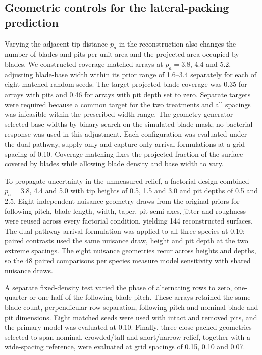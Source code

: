 \documentclass[11pt]{article}
\begin{document}
\subsection{Geometric controls for the lateral-packing prediction}
Varying the adjacent-tip distance $p_a$ in the reconstruction also changes the number of blades and pits per unit area and the projected area occupied by blades. We constructed coverage-matched arrays at $p_a=3.8$, 4.4 and \SI{5.2}{\micrometre}, adjusting blade-base width within its prior range of 1.6--\SI{3.4}{\micrometre} separately for each of eight matched random seeds. The target projected blade coverage was 0.35 for arrays with pits and 0.46 for arrays with pit depth set to zero. Separate targets were required because a common target for the two treatments and all spacings was infeasible within the prescribed width range. The geometry generator selected base widths by binary search on the simulated blade mask; no bacterial response was used in this adjustment. Each configuration was evaluated under the dual-pathway, supply-only and capture-only arrival formulations at a grid spacing of \SI{0.10}{\micrometre}. Coverage matching fixes the projected fraction of the surface covered by blades while allowing blade density and base width to vary.

To propagate uncertainty in the unmeasured relief, a factorial design combined $p_a=3.8$, 4.4 and \SI{5.0}{\micrometre} with tip heights of 0.5, 1.5 and \SI{3.0}{\micrometre} and pit depths of 0.5 and \SI{2.5}{\micrometre}. Eight independent nuisance-geometry draws from the original priors for following pitch, blade length, width, taper, pit semi-axes, jitter and roughness were reused across every factorial condition, yielding 144 reconstructed surfaces. The dual-pathway arrival formulation was applied to all three species at \SI{0.10}{\micrometre}; paired contrasts used the same nuisance draw, height and pit depth at the two extreme spacings. The eight nuisance geometries recur across heights and depths, so the 48 paired comparisons per species measure model sensitivity with shared nuisance draws.

A separate fixed-density test varied the phase of alternating rows to zero, one-quarter or one-half of the following-blade pitch. These arrays retained the same blade count, perpendicular row separation, following pitch and nominal blade and pit dimensions. Eight matched seeds were used with intact and removed pits, and the primary model was evaluated at \SI{0.10}{\micrometre}. Finally, three close-packed geometries selected to span nominal, crowded/tall and short/narrow relief, together with a wide-spacing reference, were evaluated at grid spacings of 0.15, 0.10 and \SI{0.07}{\micrometre}.
\end{document}
